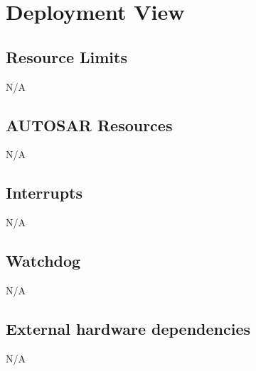 \chapter{Deployment View}

\section{Resource Limits}
N/A

\section{AUTOSAR Resources}
N/A

\section{Interrupts}
N/A

\section{Watchdog}
N/A

\section{External hardware dependencies}
N/A
